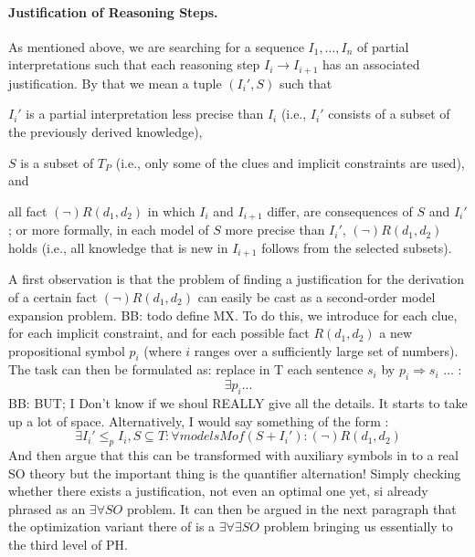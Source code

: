 \documentclass{ecai}
\newcommand\m[1]{\ensuremath{#1}\xspace}
\newcommand\leqp{\m{\leq_p}}
\newcommand\bart[1]{{\color{red}\textsc{BB}: #1}}
\begin{document}
\paragraph{Justification of Reasoning Steps.}
As mentioned above, we are searching for a sequence $I_1,\dots, I_n$ of partial interpretations such that each reasoning step $I_i\to I_{i+1}$ has an associated justification. By that we mean a tuple $(I_i',S)$ such that  
\begin{compactitem}
 \item $I_i'$ is a partial interpretation less precise than $I_i$ (i.e., $I_i'$ consists of a subset of the previously derived knowledge), 
 \item $S$ is a subset of $T_P$ (i.e., only some of the clues and implicit constraints are used), and 
 \item all fact $(\lnot) R(d_1,d_2)$ in which $I_i$ and $I_{i+1}$ differ, are consequences of $S$ and $I_i'$; or more formally, in each model of $S$ more precise than $I_i'$, $(\lnot) R(d_1,d_2)$ holds (i.e., all knowledge that is new in $I_{i+1}$ follows from the selected subsets).
\end{compactitem}
A first observation is that the problem of finding a justification for the derivation of a certain fact $(\lnot) R(d_1,d_2)$ can easily be cast as a second-order model expansion problem. \bart{todo define MX}. 
To do this, we introduce for each clue, for each implicit constraint, and for each possible fact $R(d_1,d_2)$ a new propositional symbol $p_i$ (where $i$ ranges over a sufficiently large set of numbers). 
The task can then be formulated as: replace in T each sentence $s_i$ by $p_i\Rightarrow s_i$ ... : 
\[\exists p_i... \]
\bart{BUT; I Don't know if we shoul REALLY give all the details. It starts to take up a lot of space. Alternatively, I would say something of the form : 
\[\exists I_i'\leqp I_i, S\subseteq T: \forall models M of (S+I_i'): (\lnot) R(d_1,d_2) \]
And then argue that this can be transformed with auxiliary symbols in to a real SO theory but the important thing is the quantifier alternation! Simply checking whether there exists a justification, not even an optimal one yet, si already phrased as an $\exists\forall SO$ problem. It can then be argued in the next paragraph that the optimization variant there of is a $\exists\forall\exists SO$ problem bringing us essentially to the third level of PH. 
}
\end{document}
